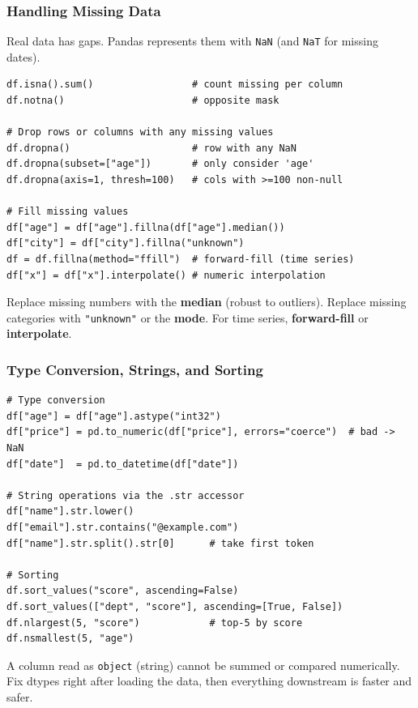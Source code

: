 \documentclass[aspectratio=169,10pt]{beamer}
\newcommand{\keyword}[1]{\textcolor{PrimaryBlue}{\textbf{#1}}}
\newcommand{\codeword}[1]{\texttt{#1}}
\newenvironment{bluebox}[1]{%
  \vspace{0.08cm}\begin{tcolorbox}[lecturebox,title={#1},fontupper=\small]%
}{\end{tcolorbox}\vspace{0.05cm}}
\begin{document}
\begin{frame}[fragile]
\frametitle{Handling Missing Data}
\small
Real data has gaps. Pandas represents them with \codeword{NaN} (and \codeword{NaT} for missing dates).

\vspace{0.12cm}
\begin{lstlisting}[style=pycode]
df.isna().sum()                 # count missing per column
df.notna()                      # opposite mask

# Drop rows or columns with any missing values
df.dropna()                     # row with any NaN
df.dropna(subset=["age"])       # only consider 'age'
df.dropna(axis=1, thresh=100)   # cols with >=100 non-null

# Fill missing values
df["age"] = df["age"].fillna(df["age"].median())
df["city"] = df["city"].fillna("unknown")
df = df.fillna(method="ffill")  # forward-fill (time series)
df["x"] = df["x"].interpolate() # numeric interpolation
\end{lstlisting}

\begin{bluebox}{Imputation choices}
Replace missing numbers with the \keyword{median} (robust to outliers). Replace missing categories with \codeword{"unknown"} or the \keyword{mode}. For time series, \keyword{forward-fill} or \keyword{interpolate}.
\end{bluebox}
\end{frame}


\begin{frame}[fragile]
\frametitle{Type Conversion, Strings, and Sorting}
\small
\begin{lstlisting}[style=pycode]
# Type conversion
df["age"] = df["age"].astype("int32")
df["price"] = pd.to_numeric(df["price"], errors="coerce")  # bad -> NaN
df["date"]  = pd.to_datetime(df["date"])

# String operations via the .str accessor
df["name"].str.lower()
df["email"].str.contains("@example.com")
df["name"].str.split().str[0]      # take first token

# Sorting
df.sort_values("score", ascending=False)
df.sort_values(["dept", "score"], ascending=[True, False])
df.nlargest(5, "score")            # top-5 by score
df.nsmallest(5, "age")
\end{lstlisting}

\begin{tcolorbox}[lecturebox,title=Why convert types early]
A column read as \codeword{object} (string) cannot be summed or compared numerically. Fix dtypes right after loading the data, then everything downstream is faster and safer.
\end{tcolorbox}
\end{frame}
\end{document}
